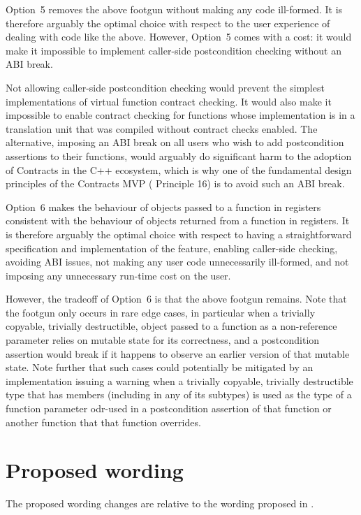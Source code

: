 Option~5 removes the above footgun without making any code ill-formed. It is therefore arguably the optimal choice with respect to the user experience of dealing with code like the above. However, Option~5 comes with a cost: it would make it impossible to implement caller-side postcondition checking without an ABI break.

Not allowing caller-side postcondition checking would prevent the simplest implementations of virtual function contract checking.  It would also make it impossible to enable contract checking for functions whose implementation is in a translation unit that was compiled without contract checks enabled. The alternative, imposing an ABI break on all users who wish to add postcondition assertions to their functions, would arguably do significant harm to the adoption of Contracts in the C++ ecosystem, which is why one of the fundamental design principles of the Contracts MVP (\cite{P2900R10} Principle 16) is to avoid such an ABI break.

Option~6 makes the behaviour of objects passed to a function in registers consistent with the behaviour of objects returned from a function in registers. It is therefore arguably the optimal choice with respect to having a straightforward specification and implementation of the feature, enabling caller-side checking, avoiding ABI issues, not making any user code unnecessarily ill-formed, and not imposing any unnecessary run-time cost on the user.

However, the tradeoff of Option~6 is that the above footgun remains. Note that the footgun only occurs in rare edge cases, in particular when a trivially copyable, trivially destructible,  object passed to a function as a non-reference parameter relies on mutable state for its correctness, and a postcondition assertion would break if it happens to observe an earlier version of that mutable state. Note further that such cases could potentially be mitigated by an implementation issuing a warning when a trivially copyable, trivially destructible type that has  members (including in any of its subtypes) is used as the type of a function parameter odr-used in a postcondition assertion of that function or another function that that function overrides.

\section{Proposed wording}

The proposed wording changes are relative to the wording proposed in \cite{P2900R10}.

